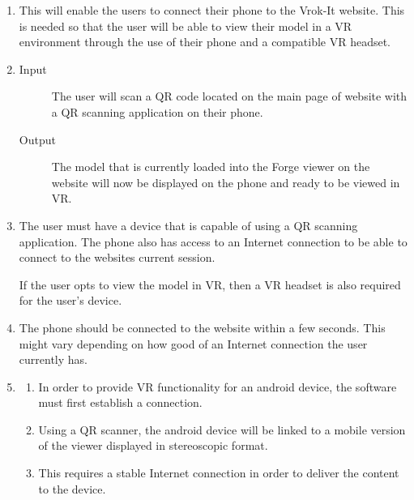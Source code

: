 \documentclass[letterpaper, 10pt, draftclsnofoot, compsoc, onecolumn]{IEEEtran}
\begin{document}
\begin{enumerate}

	\item This will enable the users to connect their phone to the Vrok-It website. This is needed so that the user will be able to view their model in a VR environment through the use of their phone and a compatible VR headset. 

	\item
	\begin{description}
		\item[Input] The user will scan a QR code located on the main page of website with a QR scanning application on their phone. 
		\item[Output] The model that is currently loaded into the Forge viewer on the website will now be displayed on the phone and ready to
		be viewed in VR. 
	\end{description}

	\item The user must have a device that is capable of using a QR scanning application. The phone also has access to an Internet 
	connection to be able to connect to the websites current session. 
	
	If the user opts to view the model in VR, then a VR headset is also required for the user's device.

	\item The phone should be connected to the website within a few seconds. This might vary depending on how good of an Internet 
	connection the user currently has. 

	\item
	\begin{enumerate}
		\item In order to provide VR functionality for an android device, the software must first establish a connection. 
		\item Using a QR scanner, the android device will be linked to a mobile version of the viewer displayed in stereoscopic format. 
		\item This requires a stable Internet connection in order to deliver the content to the device.
	\end{enumerate}
\end{enumerate}
\end{document}
